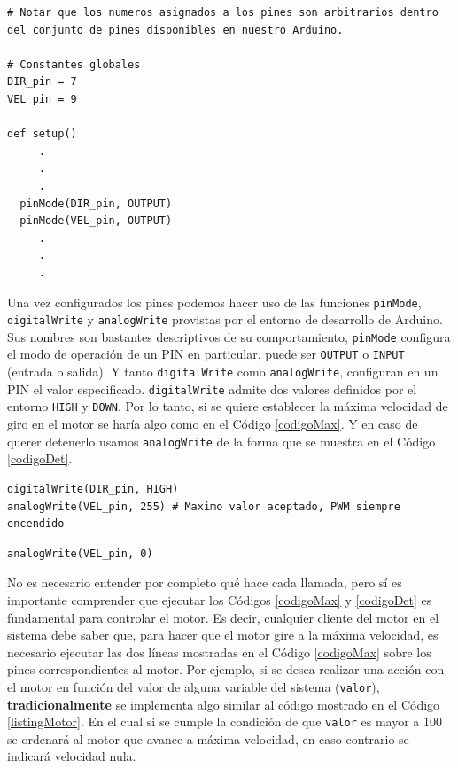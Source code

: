 \begin{lstlisting}[caption=Configuración inicial del control del motor DC.,label={listing1}]
# Notar que los numeros asignados a los pines son arbitrarios dentro del conjunto de pines disponibles en nuestro Arduino.

# Constantes globales
DIR_pin = 7
VEL_pin = 9

def setup()
     .
     .
     .
  pinMode(DIR_pin, OUTPUT)
  pinMode(VEL_pin, OUTPUT)
     .
     .
     .
\end{lstlisting}


Una vez configurados los pines podemos hacer uso de las funciones \verb|pinMode|,\\ \verb|digitalWrite| y \verb|analogWrite| provistas por el entorno de desarrollo de Arduino. Sus nombres son bastantes descriptivos de su comportamiento, \verb|pinMode| configura el modo de operación de un PIN en particular, puede ser \verb|OUTPUT| o \verb|INPUT| (entrada o salida). Y tanto \verb|digitalWrite| como \verb|analogWrite|, configuran en un PIN el valor especificado. \verb|digitalWrite| admite dos valores definidos por el entorno \verb|HIGH| y \verb|DOWN|. Por lo tanto, si se quiere establecer la máxima velocidad de giro en el motor se haría algo como en el Código \ref{codigoMax}. Y en caso de querer detenerlo usamos \verb|analogWrite| de la forma que se muestra en el Código \ref{codigoDet}.

\begin{lstlisting}[caption=Establecer 
máxima velocidad giro en sentido horario.,label={codigoMax}]
digitalWrite(DIR_pin, HIGH)
analogWrite(VEL_pin, 255) # Maximo valor aceptado, PWM siempre encendido
\end{lstlisting}

\begin{lstlisting}[caption=Detener giro del motor DC., label={codigoDet}]
analogWrite(VEL_pin, 0)
\end{lstlisting}

No es necesario entender por completo qué hace cada llamada, pero sí es importante comprender que ejecutar los Códigos \ref{codigoMax} y \ref{codigoDet} es fundamental para controlar el motor. Es decir, cualquier cliente del motor en el sistema debe saber que, para hacer que el motor gire a la máxima velocidad, es necesario ejecutar las dos líneas mostradas en el Código \ref{codigoMax} sobre los pines correspondientes al motor. Por ejemplo, si se desea realizar una acción con el motor en función del valor de alguna variable del sistema (\verb|valor|), \textbf{tradicionalmente} se implementa algo similar al código mostrado en el Código \ref{listingMotor}. En el cual si se cumple la condición de que \verb|valor| es mayor a 100 se ordenará al motor que avance a máxima velocidad, en caso contrario se indicará velocidad nula.

